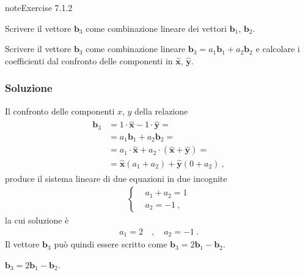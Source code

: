 \documentclass[letterpaper,10pt,italian]{jupyterBook}
\begin{document}
\begin{sphinxadmonition}{note}{Exercise 7.1.2}



\sphinxAtStartPar
Scrivere il vettore \(\mathbf{b}_3\) come combinazione lineare dei vettori \(\mathbf{b}_1\), \(\mathbf{b}_2\).

\sphinxAtStartPar
{} Scrivere il vettore \(\mathbf{b}_3\) come combinazione lineare \(\mathbf{b}_3 = a_1 \mathbf{b}_1 + a_2 \mathbf{b}_2\) e calcolare i coefficienti dal confronto delle componenti in \(\hat{\mathbf{x}}\), \(\hat{\mathbf{y}}\).
\subsubsection*{Soluzione}

\sphinxAtStartPar
Il confronto delle componenti \(x\), \(y\) della relazione
\begin{equation*}
\begin{split}\begin{aligned}
  \mathbf{b}_3
  & = 1 \cdot \hat{\mathbf{x}} - 1 \cdot \hat{\mathbf{y}} = \\
  & = a_1 \mathbf{b}_1 + a_2 \mathbf{b}_2 = \\
  & = a_1 \cdot \hat{\mathbf{x}} + a_2 \cdot ( \hat{\mathbf{x}} + \hat{\mathbf{y}} ) = \\
  & = \hat{\mathbf{x}} ( a_1 + a_2 ) + \hat{\mathbf{y}} ( 0 + a_2 ) \ ,
\end{aligned}\end{split}
\end{equation*}
\sphinxAtStartPar
produce il sistema lineare di due equazioni in due incognite
\begin{equation*}
\begin{split}\left\{\begin{aligned}
  & a_1 + a_2 = 1 \\
  &       a_2 =-1 \ ,
\end{aligned}\right.\end{split}
\end{equation*}
\sphinxAtStartPar
la cui soluzione è
\begin{equation*}
\begin{split}a_1 = 2 \quad , \quad a_2 = - 1 \ .\end{split}
\end{equation*}
\sphinxAtStartPar
Il vettore \(\mathbf{b}_3\) può quindi essere scritto come \(\mathbf{b}_3 = 2 \mathbf{b}_1 - \mathbf{b}_2\).

\sphinxAtStartPar
{} \(\mathbf{b}_3 = 2 \mathbf{b}_1 - \mathbf{b}_2\).
\end{sphinxadmonition}
\end{document}
